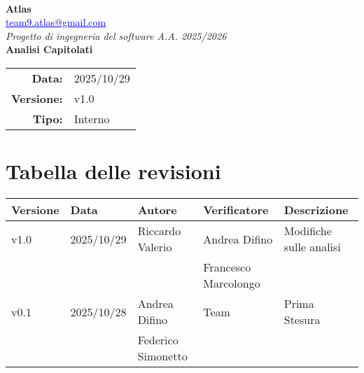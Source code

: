 \documentclass[a4paper,12pt]{article}
\makeatletter
\newcommand{\Gruppo}{Atlas}
\newcommand{\Email}{\href{mailto:team9.atlas@gmail.com}{\textcolor{blue}{\underline{team9.atlas@gmail.com}}}}
\newcommand{\Titolo}{Analisi Capitolati}
\newcommand{\DataModifica}{2025/10/29}
\newcommand{\LogoGruppo}{img/AtlasLogo.png} %
\newcommand{\VersioneVerbale}{v1.0} %
\newcommand{\Interno}{Interno}
\makeatother
\begin{document}
\begin{titlepage}
    \centering

    \vspace*{0cm}
    \\[0.8cm]

    {\LARGE \textbf{\Gruppo}}\\[0.1cm]
    {\large \Email}\\[1.2cm]

    {\Large \textit{Progetto di ingegneria del software A.A. 2025/2026}}\\[1.5cm]

    {\Huge \textbf{\Titolo}}\\[1.5cm]

    \begin{tabular}{rl}
        \textbf{Data:} & \DataModifica \\
        \textbf{Versione:} & \VersioneVerbale \\
        \textbf{Tipo:} & \Interno \\
    \end{tabular}

\end{titlepage}


\section*{Tabella delle revisioni}{
    \begin{center} 
        \begin{tabular}{|l|l|l|l|l|}
            \hline
            \textbf{Versione} & \textbf{Data} & \textbf{Autore} & \textbf{Verificatore} & \textbf{Descrizione} \\
            \hline
            v1.0& 2025/10/29 & Riccardo Valerio & Andrea Difino & Modifiche sulle analisi \\
            &&& Francesco Marcolongo & \\
            \hline
            v0.1 & 2025/10/28 & Andrea Difino & Team & Prima Stesura \\
            && Federico Simonetto &&\\
            \hline
            
        \end{tabular}
    \end{center}
}
\end{document}
